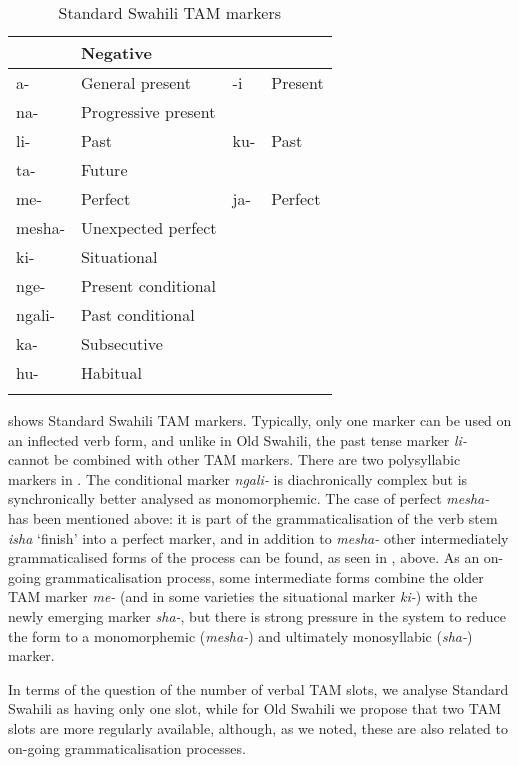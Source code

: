 \documentclass[output=paper]{langscibook}
\begin{document}
\begin{table}
\begin{tabular}{llll}

\lsptoprule

\multicolumn{2}{l}{{Affirmative}} & \multicolumn{2}{l}{{Negative}}\\
\midrule
{a-} & General present & {-i} & Present\\
{na-} & Progressive present \\
{li-} & Past & {ku-} & Past\\
{ta-} & Future \\
{me-} & Perfect & {ja-} & Perfect\\
{mesha-}  & Unexpected perfect \\
{ki-} & Situational &  & \\
{nge-} & Present conditional &  & \\
{ngali-} & Past conditional &  & \\
{ka-} & Subsecutive &  & \\
{hu-} & Habitual &  & \\
\lspbottomrule
\end{tabular}
\caption{\label{tab:marten:4} Standard Swahili TAM markers}
\end{table}

 shows Standard Swahili TAM markers. Typically, only one marker can be used on an inflected verb form, and unlike in Old Swahili, the past tense marker \textit{{}li-} cannot be combined with other TAM markers. There are two polysyllabic markers in . The conditional marker \textit{{}ngali-} is diachronically complex but is synchronically better analysed as monomorphemic. The case of perfect \textit{{}mesha-} has been mentioned above: it is part of the grammaticalisation of the verb stem \textit{{}isha} ‘finish’ into a perfect marker, and in addition to \textit{{}mesha-} other intermediately grammaticalised forms of the process can be found, as seen in , above. As an on-going grammaticalisation process, some intermediate forms combine the older TAM marker \textit{me-} (and in some varieties the situational marker \textit{ki-}) with the newly emerging marker \textit{sha-}, but there is strong pressure in the system to reduce the form to a monomorphemic (\textit{mesha\nobreakdash-}) and ultimately monosyllabic (\textit{sha-}) marker. 

In terms of the question of the number of verbal TAM slots, we analyse Standard Swahili as having only one slot, while for Old Swahili we propose that two TAM slots are more regularly available, although, as we noted, these are also related to on-going grammaticalisation processes. 
\end{document}
